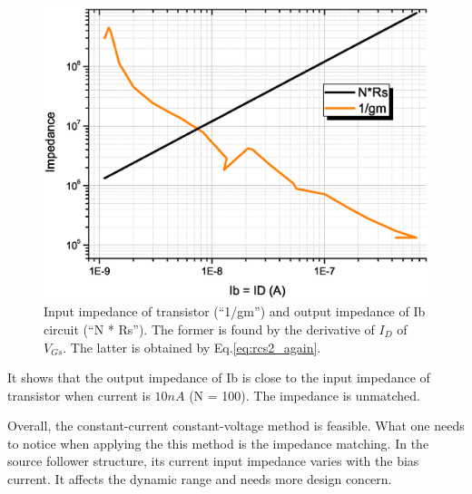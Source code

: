 \begin{figure}[!htbp]
   \centering
   \includegraphics[width=1\textwidth]{../images/chapter4/SF_impedance.eps}
   \caption{Input impedance of transistor (``1/gm'') and output impedance of Ib circuit (``N * Rs''). The former is found by the derivative of $I_D$ of $V_{Gs}$. The latter is obtained by Eq.\ref{eq:rcs2_again}.}
   \label{fig:SF_imp}
\end{figure}


It shows that the output impedance of Ib is close to the input impedance of transistor when current is $10n A$ (N = 100).
The impedance is unmatched.

Overall, the constant-current constant-voltage method is feasible.
What one needs to notice when applying the this method is the impedance matching.
In the source follower structure, its current input impedance varies with the bias current.
It affects the dynamic range and needs more design concern.


